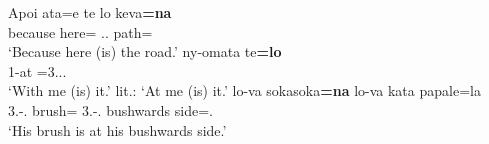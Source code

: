 \begin{exe}
\ex\label{SavLoc}
\begin{xlist}
\ex\gll Apoi ata=e te lo keva\textbf{=na}\\
because here=\emphat{} \emphat{} \deter.\sg.\mas{} path=\nom{}\\
\glt `Because here (is) the road.'
\ex\gll ny-omata te\textbf{=lo}\\
1\sg{}-at \partic{}=3.\sg{}.\mas{}.\nom{}\\
\glt `With me (is) it.' lit.: `At me (is) it.'
\ex\gll lo-va sokasoka\textbf{=na} lo-va kata papale=la\\
3\sg{}.\mas-\gen.\mas{} brush=\nom{} 3\sg{}.\mas-\gen.\mas{} bushwards side=\loc.\mas{}\\
\glt `His brush is at his bushwards side.'
\end{xlist}
\end{exe}

%

